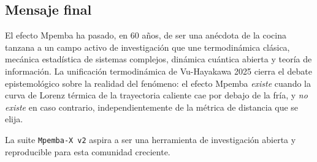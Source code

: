\subsection{Mensaje final}

El efecto Mpemba ha pasado, en 60 años, de ser una anécdota de la cocina 
tanzana a un campo activo de investigación que une termodinámica clásica, 
mecánica estadística de sistemas complejos, dinámica cuántica abierta y teoría 
de información. La unificación termodinámica de Vu-Hayakawa 2025 cierra el 
debate epistemológico sobre la realidad del fenómeno: el efecto Mpemba 
\emph{existe} cuando la curva de Lorenz térmica de la trayectoria caliente cae 
por debajo de la fría, y \emph{no existe} en caso contrario, independientemente 
de la métrica de distancia que se elija.

La suite \texttt{Mpemba-X v2} aspira a ser una herramienta de investigación 
abierta y reproducible para esta comunidad creciente.
